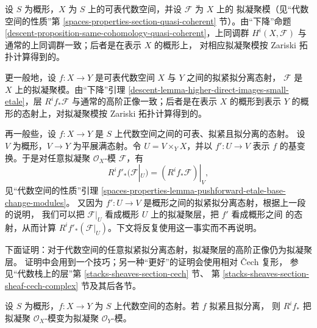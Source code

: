 \noindent
设 $S$ 为概形，$X$ 为 $S$ 上的可表代数空间，并设 $\mathcal{F}$ 为 $X$ 上的
拟凝聚模（见“代数空间的性质”第
\ref{spaces-properties-section-quasi-coherent} 节）。由“下降”命题
\ref{descent-proposition-same-cohomology-quasi-coherent}，上同调群
$H^i(X, \mathcal{F})$ 与通常的上同调群一致；后者是在表示 $X$ 的概形上，
对相应拟凝聚模按 Zariski 拓扑计算得到的。

\medskip\noindent
更一般地，设 $f : X \to Y$ 是可表代数空间 $X$ 与 $Y$ 之间的拟紧拟分离态射，
$\mathcal{F}$ 是 $X$ 上的拟凝聚模。由“下降”引理
\ref{descent-lemma-higher-direct-images-small-etale}，层
$R^if_*\mathcal{F}$ 与通常的高阶正像一致；后者是在表示 $X$ 的概形到表示
$Y$ 的概形的态射上，对拟凝聚模按 Zariski 拓扑计算得到的。

\medskip\noindent
再一般些，设 $f : X \to Y$ 是 $S$ 上代数空间之间的可表、拟紧且拟分离的态射。
设 $V$ 为概形，$V \to Y$ 为平展满态射。令 $U = V \times_Y X$，并以
$f' : U \to V$ 表示 $f$ 的基变换。于是对任意拟凝聚
$\mathcal{O}_X$-模 $\mathcal{F}$，有
\begin{equation}
\label{equation-representable-higher-direct-image}
R^if'_*(\mathcal{F}|_U) = (R^if_*\mathcal{F})|_V,
\end{equation}
见“代数空间的性质”引理
\ref{spaces-properties-lemma-pushforward-etale-base-change-modules}。
又因为 $f' : U \to V$ 是概形之间的拟紧拟分离态射，根据上一段的说明，
我们可以把 $\mathcal{F}|_U$ 看成概形 $U$ 上的拟凝聚层，把 $f'$ 看成概形之间
的态射，从而计算 $R^if'_*(\mathcal{F}|_U)$。下文将反复使用这一事实而不再说明。

\medskip\noindent
下面证明：对于代数空间的任意拟紧拟分离态射，拟凝聚层的高阶正像仍为拟凝聚层。
证明中会用到一个技巧；另一种“更好”的证明会使用相对 {\v C}ech 复形，
参见“代数栈上的层”第 \ref{stacks-sheaves-section-cech} 节、
第 \ref{stacks-sheaves-section-sheaf-cech-complex} 节及其后各节。

\begin{lemma}
\label{lemma-higher-direct-image}
设 $S$ 为概形，$f : X \to Y$ 为 $S$ 上代数空间的态射。若 $f$ 拟紧且拟分离，
则 $R^if_*$ 把拟凝聚 $\mathcal{O}_X$-模变为拟凝聚 $\mathcal{O}_Y$-模。
\end{lemma}

